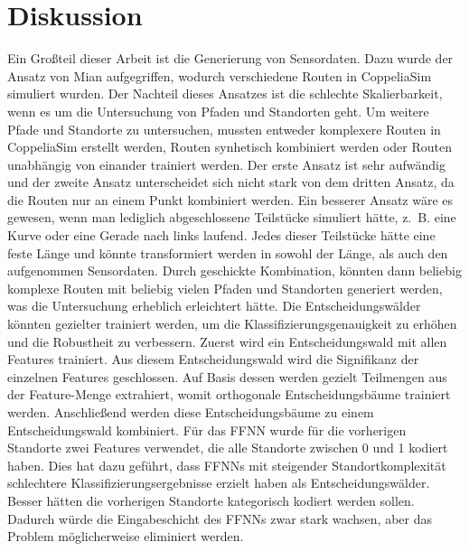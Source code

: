 \chapter{Diskussion}
\label{chapter:discussion}
Ein Großteil dieser Arbeit ist die Generierung von Sensordaten.
Dazu wurde der Ansatz von Mian aufgegriffen, wodurch verschiedene Routen in CoppeliaSim simuliert wurden.
Der Nachteil dieses Ansatzes ist die schlechte Skalierbarkeit, wenn es um die Untersuchung von Pfaden und Standorten geht.
Um weitere Pfade und Standorte zu untersuchen, mussten entweder komplexere Routen in CoppeliaSim erstellt werden,
Routen synhetisch kombiniert werden oder Routen unabhängig von einander trainiert werden.
\newline
\newline
Der erste Ansatz ist sehr aufwändig und der zweite Ansatz unterscheidet sich nicht stark von dem dritten Ansatz,
da die Routen nur an einem Punkt kombiniert werden.
Ein besserer Ansatz wäre es gewesen, wenn man lediglich abgeschlossene Teilstücke simuliert hätte,
z.~B. eine Kurve oder eine Gerade nach links laufend.
Jedes dieser Teilstücke hätte eine feste Länge und könnte transformiert werden in sowohl der Länge, als auch den aufgenommen Sensordaten.
Durch geschickte Kombination, könnten dann beliebig komplexe Routen mit beliebig vielen Pfaden und Standorten generiert werden,
was die Untersuchung erheblich erleichtert hätte.
\newline
\newline
Die Entscheidungswälder könnten gezielter trainiert werden, um die Klassifizierungsgenauigkeit zu erhöhen und die Robustheit zu verbessern.
Zuerst wird ein Entscheidungswald mit allen Features trainiert.
Aus diesem Entscheidungswald wird die Signifikanz der einzelnen Features geschlossen.
Auf Basis dessen werden gezielt Teilmengen aus der Feature-Menge extrahiert, womit orthogonale Entscheidungsbäume trainiert werden.
Anschließend werden diese Entscheidungsbäume zu einem Entscheidungswald kombiniert.
\newpage
Für das FFNN wurde für die vorherigen Standorte zwei Features verwendet, die alle Standorte zwischen 0 und 1 kodiert haben.
Dies hat dazu geführt, dass FFNNs mit steigender Standortkomplexität schlechtere Klassifizierungsergebnisse erzielt haben als Entscheidungswälder.
Besser hätten die vorherigen Standorte kategorisch kodiert werden sollen.
Dadurch würde die Eingabeschicht des FFNNs zwar stark wachsen, aber das Problem möglicherweise eliminiert werden.
\newline
\newline
